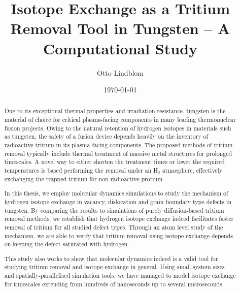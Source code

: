 \documentclass[english,twoside,openright]{HYgradu}
\title{Isotope Exchange as a Tritium Removal Tool in Tungsten -- A Computational Study}
\author{Otto Lindblom}
\date{\today}
\begin{document}
\maketitle


\begin{abstract}
Due to its exceptional thermal properties and irradiation resistance, tungsten is the material of choice for critical plasma-facing components in many leading thermonuclear fusion projects.
Owing to the natural retention of hydrogen isotopes in materials such as tungsten, the safety of a fusion device depends heavily on the inventory of radioactive tritium in its plasma-facing components. 
The proposed methods of tritium removal typically include thermal treatment of massive metal structures for prolonged timescales.
A novel way to either shorten the treatment times or lower the required temperatures is based performing the removal under an H$_2$ atmosphere, effectively exchanging the trapped tritium for non-radioactive protium. 

In this thesis, we employ molecular dynamics simulations to study the mechanism of hydrogen isotope exchange in vacancy, dislocation and grain boundary type defects in tungsten.
By comparing the results to simulations of purely diffusion-based tritium removal methods, we establish that hydrogen isotope exchange indeed facilitates faster removal of tritium for all studied defect types.  
Through an atom level study of the mechanism, we are able to verify that tritium removal using isotope exchange depends on keeping the defect saturated with hydrogen.

This study also works to show that molecular dynamics indeed is a valid tool for studying tritium removal and isotope exchange in general. 
Using small system sizes and spatially-parallelised simulation tools, we have managed to model isotope exchange for timescales extending from hundreds of nanoseconds up to several microseconds.
\end{abstract}
\end{document}
